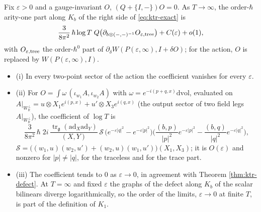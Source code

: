 \begin{theorem}
\label{thm:ktr-defectlog}
Fix $\varepsilon>0$ and a gauge-invariant $O$, $(Q+\{I,-\})O=0$. As $T\to\infty$, the order-$\hbar$ arity-one part along $K_b$ of the right side of \eqref{eq:ktr-exact} is
\[
\frac{3}{8\pi^2}\,\hbar\log T\;Q\big(\partial_{b\otimes(-,-)^{-1}}O_{\varepsilon,\rm tree}\big)+C(\varepsilon)+o(1),
\]
with $O_{\varepsilon,\rm tree}$ the order-$\hbar^0$ part of $\partial_\delta W(P(\varepsilon,\infty),I+\delta O)$; for the action, $O$ is replaced by $W(P(\varepsilon,\infty),I)$.
\begin{itemize}
\item (i) In every two-point sector of the action the coefficient vanishes for every $\varepsilon$.
\item (ii) For $O=\int\omega\,(\iota_{w_1}A,\iota_{w_2}A)$ with $\omega=e^{-i(p+q,x)}\mathrm{dvol}$, evaluated on $A|_{W_{\mathbb R}^\perp}=u\otimes X_1e^{i(p,x)}+u'\otimes X_3e^{i(q,x)}$ (the output sector of two field legs $A|_{W_{\mathbb R}^\perp}$), the coefficient of $\log T$ is
\[
\frac{3}{8\pi^2}\,\hbar\;2i\,\frac{\operatorname{tr}_{\mathfrak g}(\mathrm{ad}_X\mathrm{ad}_Y)}{(X,Y)}\,\mathcal S\,\big(e^{-\varepsilon|q|^2}-e^{-\varepsilon|p|^2}\big)\Big(\frac{(b,p)}{|p|^2}e^{-\varepsilon|p|^2}-\frac{(b,q)}{|q|^2}e^{-\varepsilon|q|^2}\Big),
\]
$\mathcal S=\big((w_1,u)(w_2,u')+(w_2,u)(w_1,u')\big)(X_1,X_3)$; it is $O(\varepsilon)$ and nonzero for $|p|\neq|q|$, for the traceless and for the trace part.
\item (iii) The coefficient tends to $0$ as $\varepsilon\to0$, in agreement with Theorem \ref{thm:ktr-defect}. At $T=\infty$ and fixed $\varepsilon$ the graphs of the defect along $K_b$ of the scalar bilinears diverge logarithmically, so the order of the limits, $\varepsilon\to0$ at finite $T$, is part of the definition of $K_1$.
\end{itemize}
\end{theorem}

